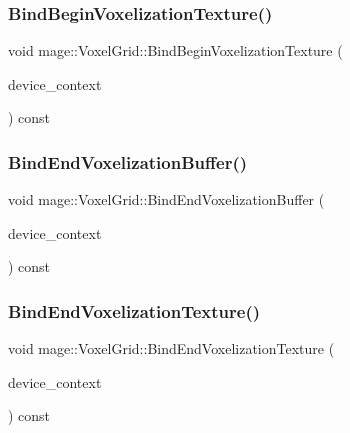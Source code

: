 \hypertarget{classmage_1_1_voxel_grid_a8d4700827e9f0385dbe5e82c66915706}{}\label{classmage_1_1_voxel_grid_a8d4700827e9f0385dbe5e82c66915706} 
\subsubsection{\texorpdfstring{Bind\+Begin\+Voxelization\+Texture()}{BindBeginVoxelizationTexture()}}
{\footnotesize\ttfamily void mage\+::\+Voxel\+Grid\+::\+Bind\+Begin\+Voxelization\+Texture (\begin{DoxyParamCaption}\item[{I\+D3\+D11\+Device\+Context4 $\ast$}]{device\+\_\+context }\end{DoxyParamCaption}) const\hspace{0.3cm}{\ttfamily [noexcept]}}

\hypertarget{classmage_1_1_voxel_grid_a85c5192cac411d6669b301d728d39975}{}\label{classmage_1_1_voxel_grid_a85c5192cac411d6669b301d728d39975} 
\subsubsection{\texorpdfstring{Bind\+End\+Voxelization\+Buffer()}{BindEndVoxelizationBuffer()}}
{\footnotesize\ttfamily void mage\+::\+Voxel\+Grid\+::\+Bind\+End\+Voxelization\+Buffer (\begin{DoxyParamCaption}\item[{I\+D3\+D11\+Device\+Context4 $\ast$}]{device\+\_\+context }\end{DoxyParamCaption}) const\hspace{0.3cm}{\ttfamily [noexcept]}}

\hypertarget{classmage_1_1_voxel_grid_a4efbdaca117973b02e6c266a3c9a8103}{}\label{classmage_1_1_voxel_grid_a4efbdaca117973b02e6c266a3c9a8103} 
\subsubsection{\texorpdfstring{Bind\+End\+Voxelization\+Texture()}{BindEndVoxelizationTexture()}}
{\footnotesize\ttfamily void mage\+::\+Voxel\+Grid\+::\+Bind\+End\+Voxelization\+Texture (\begin{DoxyParamCaption}\item[{I\+D3\+D11\+Device\+Context4 $\ast$}]{device\+\_\+context }\end{DoxyParamCaption}) const\hspace{0.3cm}{\ttfamily [noexcept]}}

